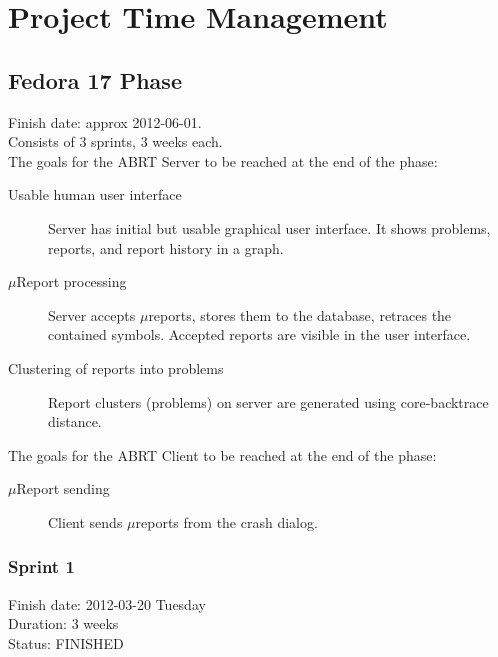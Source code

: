 \documentclass{article}
\begin{document}
\cleardoublepage
\section{Project Time Management}

\subsection{Fedora 17 Phase}
Finish date: approx 2012-06-01. \\
Consists of 3 sprints, 3 weeks each. \\

The goals for the ABRT Server to be reached at the end of the
phase:

\begin{description}
\item[Usable human user interface] Server has initial but usable
  graphical user interface.  It shows problems, reports, and report
  history in a graph.
\item[$\mu$Report processing] Server accepts $\mu$reports, stores them
  to the database, retraces the contained symbols.  Accepted reports
  are visible in the user interface.
\item[Clustering of reports into problems] Report clusters (problems)
  on server are generated using core-backtrace distance.
\end{description}

The goals for the ABRT Client to be reached at the end of the phase:
\begin{description}
\item[$\mu$Report sending] Client sends $\mu$reports from the crash
  dialog.
\end{description}

\cleardoublepage
\subsubsection{Sprint 1}
Finish date: 2012-03-20 Tuesday \\
Duration: 3 weeks \\
Status: FINISHED
\end{document}
